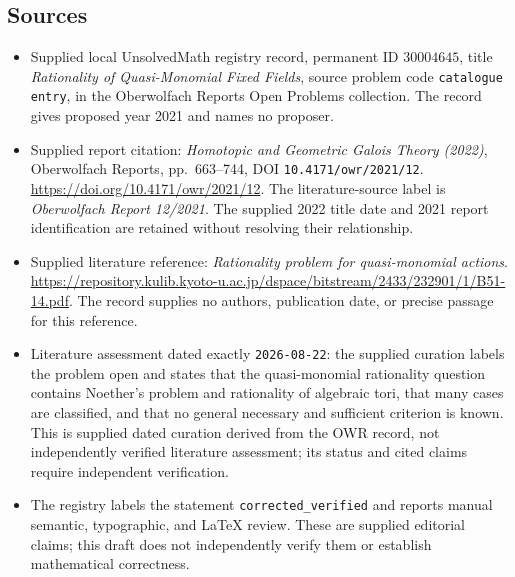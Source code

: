 \documentclass[11pt]{article}
\begin{document}
\subsection{Sources}
\begin{itemize}
\item Supplied local UnsolvedMath registry record, permanent ID \(30004645\), title \emph{Rationality of Quasi-Monomial Fixed Fields}, source problem code \texttt{catalogue entry}, in the Oberwolfach Reports Open Problems collection. The record gives proposed year 2021 and names no proposer.
\item Supplied report citation: \emph{Homotopic and Geometric Galois Theory (2022)}, Oberwolfach Reports, pp.~663--744, DOI \texttt{10.4171/owr/2021/12}. \url{https://doi.org/10.4171/owr/2021/12}. The literature-source label is \emph{Oberwolfach Report 12/2021}. The supplied 2022 title date and 2021 report identification are retained without resolving their relationship.
\item Supplied literature reference: \emph{Rationality problem for quasi-monomial actions}. \url{https://repository.kulib.kyoto-u.ac.jp/dspace/bitstream/2433/232901/1/B51-14.pdf}. The record supplies no authors, publication date, or precise passage for this reference.
\item Literature assessment dated exactly \texttt{2026-08-22}: the supplied curation labels the problem open and states that the quasi-monomial rationality question contains Noether's problem and rationality of algebraic tori, that many cases are classified, and that no general necessary and sufficient criterion is known. This is supplied dated curation derived from the OWR record, not independently verified literature assessment; its status and cited claims require independent verification.
\item The registry labels the statement \texttt{corrected\_verified} and reports manual semantic, typographic, and LaTeX review. These are supplied editorial claims; this draft does not independently verify them or establish mathematical correctness.
\end{itemize}
\end{document}
